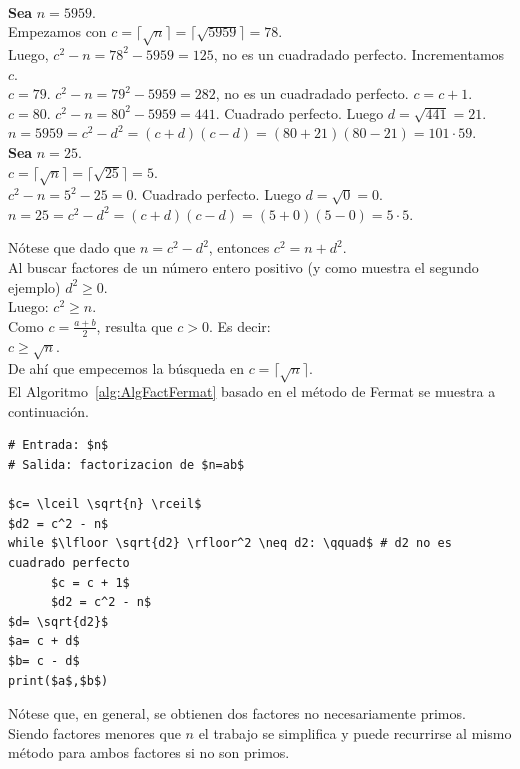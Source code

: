 \begin{ejemplo} \, \\
\textbf{Sea} $n=5959$. \\
Empezamos con $c= \lceil \sqrt{n} \rceil = \lceil \sqrt{5959} \rceil = 78$.  \\
Luego, $c^2 - n = 78^2 - 5959 = 125$, no es un cuadradado perfecto. Incrementamos $c$. \\
$c=79$. $c^2 - n = 79^2 - 5959 = 282$, no es un cuadradado perfecto. $c=c+1$. \\
$c=80$. $c^2 - n = 80^2 - 5959 = 441$. Cuadrado perfecto. Luego $d=\sqrt{441}=21$. \\
$n = 5959 = c^2 - d^2 = (c+d)(c-d) = (80+21)(80-21)=101 \cdot 59$. \\
\textbf{Sea} $n=25$. \\
$c= \lceil \sqrt{n} \rceil = \lceil \sqrt{25} \rceil = 5$.  \\
$c^2 - n = 5^2 - 25 = 0$. Cuadrado perfecto. Luego $d=\sqrt{0}=0$. \\
$n = 25 = c^2 - d^2 = (c+d)(c-d) = (5+0)(5-0) = 5 \cdot 5$.
\end{ejemplo}

Nótese que dado que $n=c^2 - d^2$, entonces $c^2 = n + d^2$. \\
Al buscar factores de un número entero positivo (y como muestra el segundo ejemplo) $d^2 \geq 0$. \\
Luego: $c^2 \geq n$. \\
Como $c = \frac{a+b}{2}$, resulta que $c>0$. Es decir: \\
$c \geq \sqrt n$. \\
De ahí que empecemos la búsqueda en $c = \lceil \sqrt{n} \rceil$. \\

El Algoritmo~\ref{alg:AlgFactFermat} basado en el método de Fermat se muestra a continuación.

\begin{lstlisting}[caption={Algoritmo de Fermat}, label={alg:AlgFactFermat}, mathescape=true]
# Entrada: $n$
# Salida: factorizacion de $n=ab$

$c= \lceil \sqrt{n} \rceil$ 
$d2 = c^2 - n$
while $\lfloor \sqrt{d2} \rfloor^2 \neq d2: \qquad$ # d2 no es cuadrado perfecto
      $c = c + 1$
      $d2 = c^2 - n$
$d= \sqrt{d2}$
$a= c + d$
$b= c - d$
print($a$,$b$)
\end{lstlisting}

Nótese que, en general, se obtienen dos factores no necesariamente primos. \\
Siendo factores menores que $n$ el trabajo se simplifica y puede recurrirse al mismo método para ambos factores si no son primos. 

